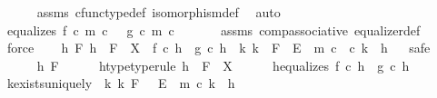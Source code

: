 \begin{isabellebody}
\ \ \ \ \isamarkupfalse%
\ assms{\isacharparenleft}{\kern0pt}{}{\isacharcomma}{\kern0pt}{}{\isacharparenright}{\kern0pt}\ cfunc{\isacharunderscore}{\kern0pt}type{\isacharunderscore}{\kern0pt}def\ isomorphism{\isacharunderscore}{\kern0pt}def\ \isamarkupfalse%
\ auto\isanewline
\isanewline
\ \ \isamarkupfalse%
\ equalizes{\isacharcolon}{\kern0pt}\ {\isachardoublequoteopen}f\ {\isasymcirc}\isactrlsub c\ m\ {\isasymcirc}\isactrlsub c\ {\isasymphi}\ {\isacharequal}{\kern0pt}\ g\ {\isasymcirc}\isactrlsub c\ m\ {\isasymcirc}\isactrlsub c\ {\isasymphi}{\isachardoublequoteclose}\isanewline
\ \ \ \ \isamarkupfalse%
\ assms\ comp{\isacharunderscore}{\kern0pt}associative{}\ equalizer{\isacharunderscore}{\kern0pt}def\ \isamarkupfalse%
\ force\isanewline
\ \ \isamarkupfalse%
\ {\isachardoublequoteopen}{\isasymforall}h\ F{\isachardot}{\kern0pt}\ h\ {\isacharcolon}{\kern0pt}\ F\ {\isasymrightarrow}\ X\ {\isasymand}\ f\ {\isasymcirc}\isactrlsub c\ h\ {\isacharequal}{\kern0pt}\ g\ {\isasymcirc}\isactrlsub c\ h\ {\isasymlongrightarrow}\ {\isacharparenleft}{\kern0pt}{\isasymexists}{\isacharbang}{\kern0pt}k{\isachardot}{\kern0pt}\ k\ {\isacharcolon}{\kern0pt}\ F\ {\isasymrightarrow}\ E{\isacharprime}{\kern0pt}\ {\isasymand}\ {\isacharparenleft}{\kern0pt}m\ {\isasymcirc}\isactrlsub c\ {\isasymphi}{\isacharparenright}{\kern0pt}\ {\isasymcirc}\isactrlsub c\ k\ {\isacharequal}{\kern0pt}\ h{\isacharparenright}{\kern0pt}{\isachardoublequoteclose}\isanewline
\ \ \isamarkupfalse%
{\isacharparenleft}{\kern0pt}safe{\isacharparenright}{\kern0pt}\isanewline
\ \ \ \ \isamarkupfalse%
\ h\ F\isanewline
\ \ \ \ \isamarkupfalse%
\ h{\isacharunderscore}{\kern0pt}type{\isacharbrackleft}{\kern0pt}type{\isacharunderscore}{\kern0pt}rule{\isacharbrackright}{\kern0pt}{\isacharcolon}{\kern0pt}\ {\isachardoublequoteopen}h\ {\isacharcolon}{\kern0pt}\ F\ {\isasymrightarrow}\ X{\isachardoublequoteclose}\isanewline
\ \ \ \ \isamarkupfalse%
\ h{\isacharunderscore}{\kern0pt}equalizes{\isacharcolon}{\kern0pt}\ {\isachardoublequoteopen}f\ {\isasymcirc}\isactrlsub c\ h\ {\isacharequal}{\kern0pt}\ g\ {\isasymcirc}\isactrlsub c\ h{\isachardoublequoteclose}\isanewline
\ \ \ \ \isamarkupfalse%
\ k{\isacharunderscore}{\kern0pt}exists{\isacharunderscore}{\kern0pt}uniquely{\isacharcolon}{\kern0pt}\ {\isachardoublequoteopen}{\isasymexists}{\isacharbang}{\kern0pt}\ k{\isachardot}{\kern0pt}\ k{\isacharcolon}{\kern0pt}\ F\ \ {\isasymrightarrow}\ E\ {\isasymand}\ m\ {\isasymcirc}\isactrlsub c\ k\ {\isacharequal}{\kern0pt}\ h{\isachardoublequoteclose}\isanewline

\end{isabellebody}
